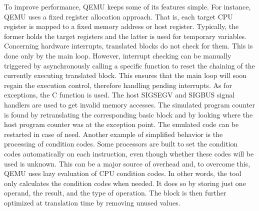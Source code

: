 \documentclass[11pt,twoside]{article}
\begin{document}
  To improve performance, QEMU keeps some of its features simple.
  For instance, QEMU uses a fixed register allocation approach.
  That is, each target CPU register is mapped to a fixed
  memory address or host register. Typically, the former holds 
  the target registers and the latter is used
  for temporary variables.
  Concerning hardware interrupts, translated blocks do not check for
  them. This is done only by the main loop.
  However, interrupt checking can be manually triggered by
  asynchronously calling
  a specific function to reset the chaining of the
  currently executing translated block. This ensures that the
  main loop will soon regain the execution control,
  therefore handling pending interrupts.
  As for exceptions, the C function  is used.
  The host SIGSEGV and SIGBUS signal handlers are used to get invalid
  memory accesses. The simulated program counter is found by 
  retranslating the corresponding basic block and by looking where
  the host program counter was at the exception point. The emulated
  code can be restarted in case of need.
  Another example of simplified behavior is the processing of
  condition codes.
  Some processors are built to set the condition codes automatically
  on each instruction, even though
  whether these codes will be used is unknown.
  This can be a major source of overhead and, to overcome this, QEMU
  uses lazy evaluation of CPU condition codes.
  In other words, the tool only calculates the condition codes when
  needed. It does so by storing just one operand,
  the result,
  and the type of operation.
  The block is then further optimized at translation time
  by removing unused values.
\end{document}
